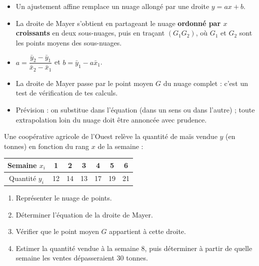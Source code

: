 \documentclass[11pt]{article}
\newcommand{\cle}[1]{{\popxbold\color{popdark}#1}}
\begin{document}
\begin{aretenir}
\begin{itemize}
\item Un \cle{ajustement affine} remplace un nuage allongé par une droite $y = ax + b$.
\item La \cle{droite de Mayer} s'obtient en partageant le nuage \textbf{ordonné par $x$ croissants} en deux sous-nuages, puis en traçant $(G_1G_2)$, où $G_1$ et $G_2$ sont les points moyens des sous-nuages.
\item $a = \dfrac{\bar{y}_2 - \bar{y}_1}{\bar{x}_2 - \bar{x}_1}$ et $b = \bar{y}_1 - a\bar{x}_1$.
\item La droite de Mayer passe par le point moyen $G$ du nuage complet : c'est un test de vérification de tes calculs.
\item Prévision : on substitue dans l'équation (dans un sens ou dans l'autre) ; toute extrapolation loin du nuage doit être annoncée avec prudence.
\end{itemize}
\end{aretenir}

\begin{exercice}
Une coopérative agricole de l'Ouest relève la quantité de maïs vendue $y$ (en tonnes) en fonction du rang $x$ de la semaine :
\begin{center}
\begin{tabular}{|c|*{6}{c}|}
\hline
\rowcolor{popblueL} Semaine $x_i$ & 1 & 2 & 3 & 4 & 5 & 6 \\
\hline
Quantité $y_i$ & 12 & 14 & 13 & 17 & 19 & 21 \\
\hline
\end{tabular}
\end{center}
\begin{enumerate}
\item Représenter le nuage de points.
\item Déterminer l'équation de la droite de Mayer.
\item Vérifier que le point moyen $G$ appartient à cette droite.
\item Estimer la quantité vendue à la semaine 8, puis déterminer à partir de quelle semaine les ventes dépasseraient 30 tonnes.
\end{enumerate}
\end{exercice}
\end{document}
